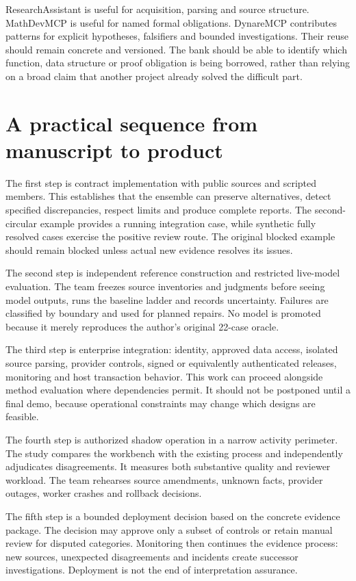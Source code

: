 \documentclass[12pt,a4paper,oneside,openany]{book}
\begin{document}
ResearchAssistant is useful for acquisition, parsing and source structure.
MathDevMCP is useful for named formal obligations. DynareMCP contributes patterns
for explicit hypotheses, falsifiers and bounded investigations. Their reuse
should remain concrete and versioned. The bank should be able to identify which
function, data structure or proof obligation is being borrowed, rather than
relying on a broad claim that another project already solved the difficult part.

\section{A practical sequence from manuscript to product}

The first step is contract implementation with public sources and scripted
members. This establishes that the ensemble can preserve alternatives, detect
specified discrepancies, respect limits and produce complete reports. The
second-circular example provides a running integration case, while synthetic
fully resolved cases exercise the positive review route. The original blocked
example should remain blocked unless actual new evidence resolves its issues.

The second step is independent reference construction and restricted live-model
evaluation. The team freezes source inventories and judgments before seeing
model outputs, runs the baseline ladder and records uncertainty. Failures are
classified by boundary and used for planned repairs. No model is promoted because
it merely reproduces the author's original 22-case oracle.

The third step is enterprise integration: identity, approved data access, isolated
source parsing, provider controls, signed or equivalently authenticated releases,
monitoring and host transaction behavior. This work can proceed alongside method
evaluation where dependencies permit. It should not be postponed until a final
demo, because operational constraints may change which designs are feasible.

The fourth step is authorized shadow operation in a narrow activity perimeter.
The study compares the workbench with the existing process and independently
adjudicates disagreements. It measures both substantive quality and reviewer
workload. The team rehearses source amendments, unknown facts, provider outages,
worker crashes and rollback decisions.

The fifth step is a bounded deployment decision based on the concrete evidence
package. The decision may approve only a subset of controls or retain manual
review for disputed categories. Monitoring then continues the evidence process:
new sources, unexpected disagreements and incidents create successor
investigations. Deployment is not the end of interpretation assurance.
\end{document}
